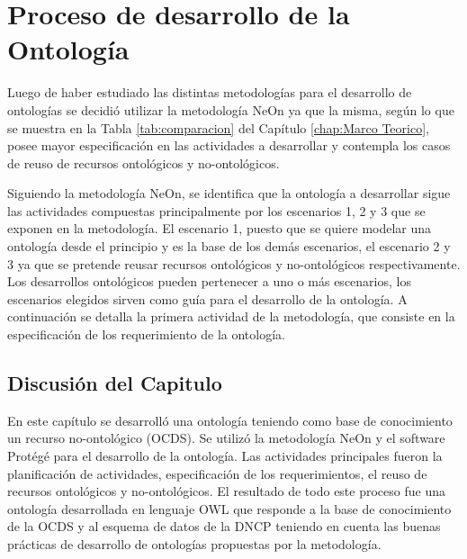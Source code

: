 \chapter{Proceso de desarrollo de la Ontología}
\label{chap:Desarrollo de la Ontologia}

Luego de haber estudiado las distintas metodologías para el desarrollo de ontologías se decidió utilizar la metodología NeOn ya que la misma, según lo que se muestra en la Tabla  \ref{tab:comparacion} del Capítulo \ref{chap:Marco Teorico}, posee mayor especificación en las actividades a desarrollar  y contempla los casos de reuso de recursos ontológicos y no-ontológicos. 

Siguiendo la metodología NeOn, se identifica que la ontología a desarrollar sigue las actividades compuestas principalmente por los escenarios 1, 2 y 3 que se exponen en la metodología. El escenario 1, puesto que se quiere modelar una ontología desde el principio y es la base de los demás escenarios, el escenario 2 y 3 ya que se pretende reusar recursos ontológicos y no-ontológicos respectivamente. Los desarrollos ontológicos pueden pertenecer a uno o más escenarios, los escenarios elegidos sirven como guía para el desarrollo de la ontología. A continuación se detalla la primera actividad de la metodología, que consiste en la especificación de los requerimiento de la ontología.









\section{Discusión del Capitulo}

En este capítulo se desarrolló una ontología teniendo como base de conocimiento un recurso no-ontológico (OCDS). Se utilizó la metodología NeOn y el software Protégé para el desarrollo de la ontología. Las actividades principales fueron la planificación de actividades, especificación de los requerimientos, el reuso de recursos ontológicos y no-ontológicos. El resultado de todo este proceso fue una ontología desarrollada en lenguaje OWL que responde a la base de conocimiento de la OCDS y al esquema de datos de la DNCP teniendo en cuenta las buenas prácticas de desarrollo de ontologías propuestas por la metodología.




